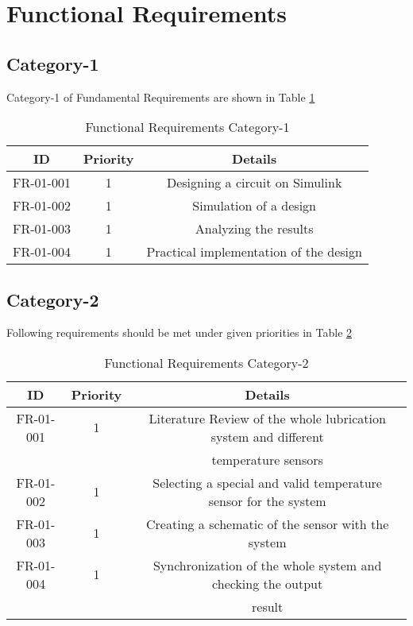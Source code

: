 \documentclass[14pt]{report}
\begin{document}
\section{\textbf{Functional Requirements}}

\subsection{\textbf{Category-1}}

Category-1 of Fundamental Requirements are shown in Table \ref{table:3.4}

\begin{table}[H]
\begin{center}
\begin{tabular}{| c | c | c | }
\hline
 ID & Priority & Details \\ 
\hline
 FR-01-001 & 1 & Designing a circuit on Simulink \\  
\hline
 FR-01-002 & 1 & Simulation of a design \\
\hline
FR-01-003& 1 & Analyzing the results \\  
\hline
FR-01-004 & 1 & Practical implementation of the design \\  
\hline
\end{tabular}
\end{center}
\caption{Functional Requirements Category-1}
\label{table:3.4}
\end{table}

\subsection{\textbf{Category-2}}

Following requirements should be met under given priorities in Table \ref{table:3.5}

\begin{table}[H]
\begin{center}
\begin{tabular}{| c | c | c | }
\hline
 ID & Priority & Details \\ 
\hline
 FR-01-001 & 1 & Literature Review of the whole lubrication system and diﬀerent\\
     &     &    temperature sensors\\   
\hline
 FR-01-002 & 1 & Selecting a special and valid temperature sensor for the system \\
\hline
FR-01-003& 1 & Creating a schematic of the sensor with the system \\  
\hline
FR-01-004 & 1 & Synchronization of the whole system and checking the output \\  
     &     &    result\\ 
\hline
\end{tabular}
\end{center}
\caption{Functional Requirements Category-2}
\label{table:3.5}
\end{table}
\end{document}
